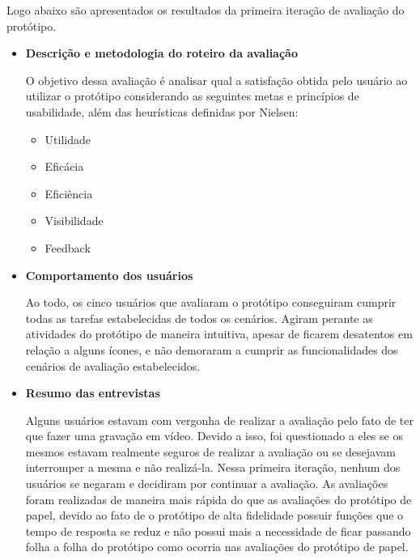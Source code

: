         Logo abaixo são apresentados os resultados da primeira iteração de avaliação do protótipo.
      
      \begin{itemize}
       \item \textbf{Descrição e metodologia do roteiro da avaliação}
       
       \subitem O objetivo dessa avaliação é analisar qual a satisfação obtida pelo usuário ao utilizar o protótipo considerando as seguintes 
       metas e princípios de usabilidade, além das heurísticas definidas por Nielsen:
       \begin{itemize}

	\item Utilidade
        \item Eficácia
        \item Eficiência
        \item Visibilidade
        \item Feedback
        
       \end{itemize}
       
       \item \textbf{Comportamento dos usuários}
       
       \subitem Ao todo, os cinco usuários que avaliaram o protótipo conseguiram cumprir todas as tarefas estabelecidas 
       de todos os cenários. Agiram perante as atividades do protótipo de maneira intuitiva, apesar de ficarem 
       desatentos em relação a alguns ícones, e não demoraram a cumprir as funcionalidades dos cenários de avaliação 
       estabelecidos.
       
       \item \textbf{Resumo das entrevistas}
       
       \subitem Alguns usuários estavam com vergonha de realizar a avaliação pelo fato de ter que fazer uma gravação em vídeo. 
       Devido a isso, foi questionado a eles se os mesmos estavam realmente seguros de realizar a avaliação ou se desejavam 
       interromper a mesma e não realizá-la. Nessa primeira iteração, nenhum dos usuários se negaram e decidiram por 
       continuar a avaliação. As avaliações foram realizadas de maneira mais rápida do que as avaliações do protótipo de papel, 
       devido ao fato de o protótipo de alta fidelidade possuir funções que o tempo de resposta se reduz e não possui mais a 
       necessidade de ficar passando folha a folha do protótipo como ocorria nas avaliações do protótipo de papel.
       

\end{itemize}
